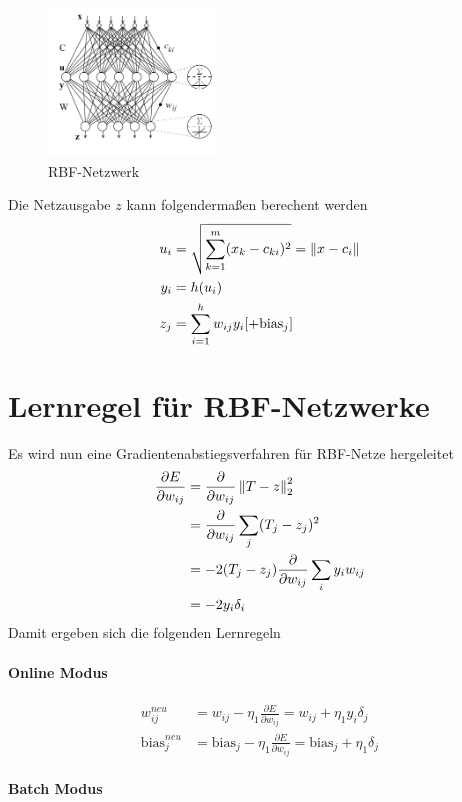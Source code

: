 \begin{figure}[h]
    \centering
    \includegraphics[width=0.4\textwidth]{img/RBF/RBFAufbau.png}
    \caption{RBF-Netzwerk}
    \label{ch_RBF_netz}
\end{figure}

Die Netzausgabe $z$ kann folgendermaßen berechent werden
\begin{align*}
    u_i &= \sqrt{\sum_{k=1}^m(x_k-c_{ki})^2} = \left\lVert x-c_i\right\rVert\\
    y_i &= h(u_i)\\
    z_j &= \sum_{i=1}^h w_{ij}y_i [+\text{bias}_j]
\end{align*}

\section{Lernregel für RBF-Netzwerke}
Es wird nun eine Gradientenabstiegsverfahren für RBF-Netze hergeleitet
\begin{align*}
    \frac{\partial E}{\partial w_{ij}} &= \frac{\partial}{\partial w_{ij}}\left\lVert T-z\right\rVert_2^2\\
    &= \frac{\partial}{\partial w_{ij}} \sum_j(T_j-z_j)^2\\
    &= -2(T_j-z_j)\frac{\partial}{\partial w_{ij}}\sum_i y_iw_{ij}\\
    &= -2y_i\delta_i
\end{align*}
Damit ergeben sich die folgenden Lernregeln\\
\paragraph{Online Modus}
\begin{align*}
    w_{ij}^{neu} &= w_{ij} - \eta_1 \frac{\partial E}{\partial w_{ij}} = w_{ij} + \eta_1 y_i\delta_j\\
    \text{bias}_j^{neu} &= \text{bias}_j - \eta_1 \frac{\partial E}{\partial w_{ij}}=\text{bias}_j +\eta_1\delta_j
\end{align*}

\paragraph{Batch Modus}

